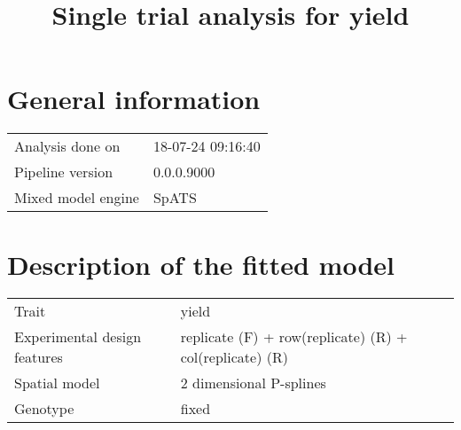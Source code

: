 \documentclass[a4paper,11pt]{article}\usepackage[]{graphicx}\usepackage[]{color}
\title{Single trial analysis for yield}%
\author{\vspace{-5ex}}
\date{\vspace{-5ex}}
\begin{document}
\maketitle

\singlespacing

\section{General information}
\begin{table}[ht]
\begin{flushleft}
\begin{tabular}{ll}
  Analysis done on & 18-07-24 09:16:40 \\ 
  Pipeline version & 0.0.0.9000 \\ 
  Mixed model engine & SpATS \\ 
  \end{tabular}
\label{general}
\end{flushleft}
\end{table}


\section{Description of the fitted model}

\begin{table}[ht]
\begin{flushleft}
\begin{tabular}{ll}
  Trait & yield \\ 
  Experimental design features & replicate (F) + row(replicate) (R) + col(replicate) (R) \\ 
  Spatial model & 2 dimensional P-splines \\ 
  Genotype & fixed \\ 
  \end{tabular}
\label{modelDescription}
\end{flushleft}
\end{table}
\end{document}
